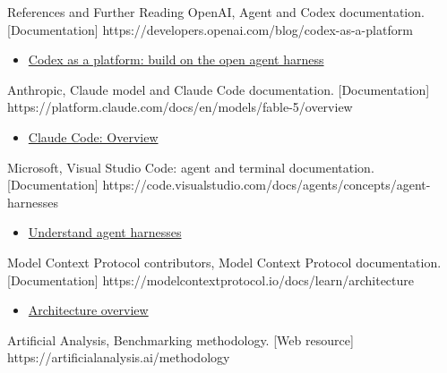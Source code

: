 \begin{frame}{References and Further Reading}
  {OpenAI, Agent and Codex documentation. [Documentation]}
  {https://developers.openai.com/blog/codex-as-a-platform}
  {\begin{itemize}
\item \href{https://developers.openai.com/blog/codex-as-a-platform}{Codex as a platform: build on the open agent harness}
\end{itemize}}
  {Anthropic, Claude model and Claude Code documentation. [Documentation]}
  {https://platform.claude.com/docs/en/models/fable-5/overview}
  {\begin{itemize}
\item \href{https://code.claude.com/docs/en/overview}{Claude Code: Overview}
\end{itemize}}
  {Microsoft, Visual Studio Code: agent and terminal documentation. [Documentation]}
  {https://code.visualstudio.com/docs/agents/concepts/agent-harnesses}
  {\begin{itemize}
\item \href{https://code.visualstudio.com/docs/agents/concepts/agent-harnesses}{Understand agent harnesses}
\end{itemize}}
  {Model Context Protocol contributors, Model Context Protocol documentation. [Documentation]}
  {https://modelcontextprotocol.io/docs/learn/architecture}
  {\begin{itemize}
\item \href{https://modelcontextprotocol.io/docs/learn/architecture}{Architecture overview}
\end{itemize}}
  {Artificial Analysis, Benchmarking methodology. [Web resource]}
  {https://artificialanalysis.ai/methodology}
  {}
\end{frame}
\fi

